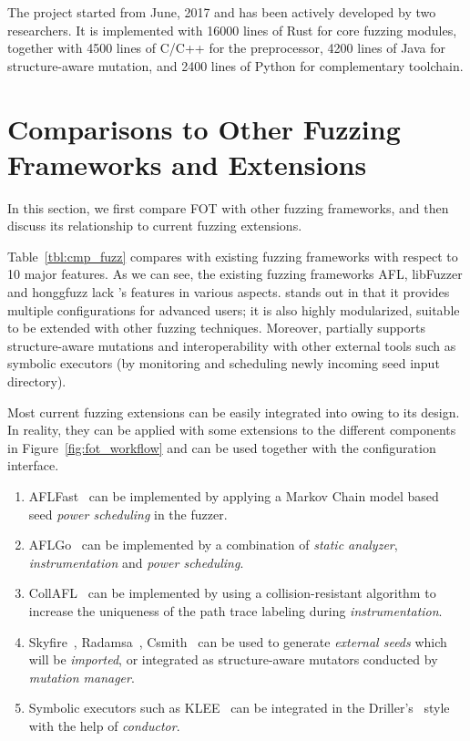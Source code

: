 The {\FOT} project started from June, 2017 and has been actively developed by two researchers. It is implemented with 16000 lines of Rust for core fuzzing modules, together with 4500 lines of C/C++ for the preprocessor, 4200 lines of Java for structure-aware mutation, and 2400 lines of Python for complementary toolchain.
  

\section{Comparisons to Other Fuzzing Frameworks and Extensions}


In this section, we first compare FOT with other fuzzing frameworks, and then discuss its relationship to current fuzzing extensions.



Table~\ref{tbl:cmp_fuzz} compares {\FOT} with existing fuzzing frameworks with respect to 10 major features. As we can see, the existing fuzzing frameworks AFL, libFuzzer and honggfuzz lack \FOT's features in various aspects. {\FOT} stands out in that it provides multiple configurations for advanced users; it is also highly modularized, suitable to be extended with other fuzzing techniques. Moreover, {\FOT} partially supports structure-aware mutations and interoperability with other external tools such as symbolic executors (by monitoring and scheduling newly incoming seed input directory).

Most current fuzzing extensions can be easily integrated into {\FOT} owing to its design. In reality, they can be applied with some extensions to the different components in Figure~\ref{fig:fot_workflow} and can be used together with the configuration interface. 

\begin{enumerate}[1)]
	\item AFLFast~\cite{Bohme:2016:CGF} can be implemented by applying a Markov Chain model based seed \emph{power scheduling} in the fuzzer. 
	\item AFLGo~\cite{Bohme:2017:DGF} can be implemented by a combination of \emph{static analyzer}, \emph{instrumentation} and \emph{power scheduling}.
	\item CollAFL~\cite{CollAFL} can be implemented by using a collision-resistant algorithm to increase the uniqueness of the path trace labeling during \emph{instrumentation}.
	\item Skyfire~\cite{junjie:2017sp:skyfire}, Radamsa~\cite{radamsa}, Csmith~\cite{csmith} can be used to generate \emph{external seeds} which will be \emph{imported}, or integrated as structure-aware mutators conducted by \emph{mutation manager}.
	\item Symbolic executors such as KLEE~\cite{klee} can be integrated in the Driller's~\cite{driller} style with the help of \emph{conductor}.
\end{enumerate}

